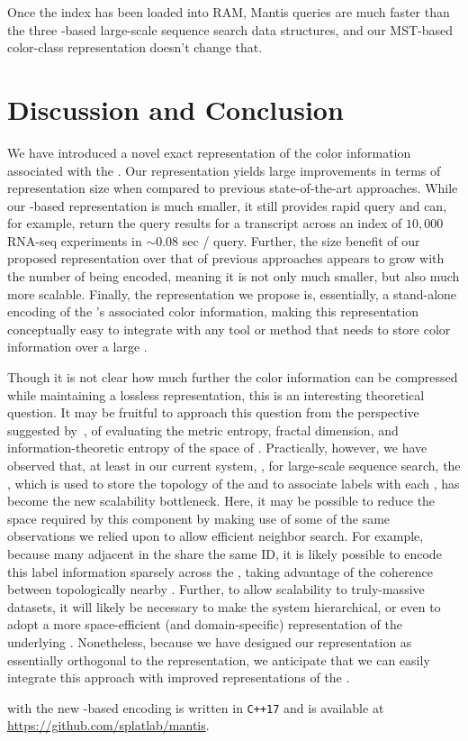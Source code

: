 Once the index has been loaded into RAM, Mantis queries are much faster than the
three \sbt-based large-scale sequence search data structures, and our MST-based
color-class representation doesn't change that.

%
\section{Discussion and Conclusion}
\label{sec:mantis_conclusion}

We have introduced a novel exact representation of the color
information associated with the \cdbg. Our representation yields large
improvements in terms of representation size when compared to previous
state-of-the-art approaches. While our \mst-based representation is
much smaller, it still provides rapid query and can, for example,
return the query results for a transcript across an index of $10,000$
RNA-seq experiments in $\sim{0.08}$ sec / query. Further, the size
benefit of our proposed representation over that of previous approaches
appears to grow with the number of \ccs being encoded, meaning it is
not only much smaller, but also much more scalable. Finally, the
representation we propose is, essentially, a stand-alone encoding of
the \cdbg's associated color information, making this representation
conceptually easy to integrate with any tool or method that needs to
store color information over a large \dbg.

Though it is not clear how much further the color information can be compressed
while maintaining a lossless representation, this is an interesting theoretical
question. It may be fruitful to approach this question from the perspective suggested
by~\citet{yu2015entropy}, of evaluating the metric entropy, fractal
dimension, and information-theoretic entropy of the space of \ccs. Practically, however,
we have observed that, at least in our current system, \prevsys, for large-scale
sequence search, the \cqf, which is used to store the topology of the \dbg and
to associate \cc labels with each \kmer, has become the new scalability
bottleneck. Here, it may be possible to reduce the space required by this
component by making use of some of the same observations we relied upon to allow
efficient \cc neighbor search. For example, because many adjacent \kmers in the
\dbg share the same \cc ID, it is likely possible to encode this label
information sparsely across the \dbg, taking advantage of the coherence between
topologically nearby \kmers. Further, to allow scalability to truly-massive
datasets, it will likely be necessary to make the system hierarchical, or even
to adopt a more space-efficient (and domain-specific) representation of the
underlying \dbg. Nonetheless, because we have designed our \cc representation as
essentially orthogonal to the \dbg representation, we anticipate that we can
easily integrate this approach with improved representations of the \dbg.

\prevsys with the new \mst-based \cc encoding is written in
\texttt{C++17} and is available at
\url{https://github.com/splatlab/mantis}.
